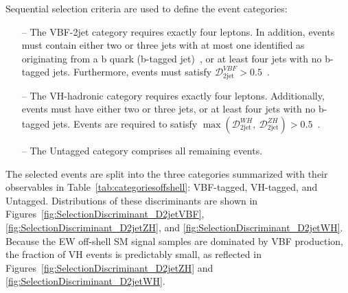 
Sequential selection criteria are used to define the event categories:
\begin{itemize}
    \item[--] The VBF-2jet category requires exactly four leptons. In addition, events must contain either two or three jets with at most one identified as originating from a b quark (b-tagged jet)~\cite{Sirunyan:2021rug}, or at least four jets with no b-tagged jets. Furthermore, events must satisfy $\mathcal{D}_\text{2jet}^{VBF} > 0.5$~\cite{Sirunyan:2021rug}.
    
    \item[--] The VH-hadronic category requires exactly four leptons. Additionally, events must have either two or three jets, or at least four jets with no b-tagged jets. Events are required to satisfy $\max(\mathcal{D}_\text{2jet}^{WH},~\mathcal{D}_\text{2jet}^{ZH}) > 0.5$~\cite{Sirunyan:2021rug}.
    
    \item[--] The Untagged category comprises all remaining events.
\end{itemize}

The selected events are split into the three categories summarized with their observables in Table~\ref{tab:categoriesoffshell}: VBF-tagged, VH-tagged, and Untagged. Distributions of these discriminants are shown in Figures~\ref{fig:SelectionDiscriminant_D2jetVBF}, \ref{fig:SelectionDiscriminant_D2jetZH}, and \ref{fig:SelectionDiscriminant_D2jetWH}. Because the EW off-shell SM signal samples are dominated by VBF production, the fraction of VH events is predictably small, as reflected in Figures~\ref{fig:SelectionDiscriminant_D2jetZH} and \ref{fig:SelectionDiscriminant_D2jetWH}.

